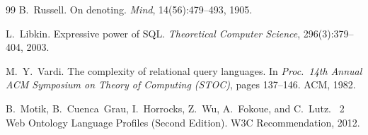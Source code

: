 \documentclass[11pt, a4paper]{article}
\theoremstyle{plain}
\theoremstyle{definition}
\theoremstyle{remark}
\begin{document}
\begin{thebibliography}{99}
B.~Russell.
\newblock On denoting.
\newblock \emph{Mind}, 14(56):479--493, 1905.

L.~Libkin.
\newblock Expressive power of {SQL}.
\newblock \emph{Theoretical Computer Science}, 296(3):379--404, 2003.

M.~Y.~Vardi.
\newblock The complexity of relational query languages.
\newblock In \emph{Proc.\ 14th Annual ACM Symposium on Theory of Computing
  (STOC)}, pages 137--146. ACM, 1982.

B.~Motik, B.~Cuenca~Grau, I.~Horrocks, Z.~Wu, A.~Fokoue, and C.~Lutz.
~2 Web Ontology Language Profiles (Second Edition).
\newblock W3C Recommendation, 2012.

\end{thebibliography}
\end{document}
